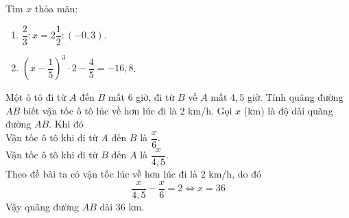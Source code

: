 	\begin{ex}%
		Tìm $x$ thỏa mãn:
		\begin{enumerate}
			\item $\dfrac{2}{3}:x=2\dfrac{1}{2}:(-0,3)$.
			\item $\left(x-\dfrac{1}{5} \right)^3\cdot 2-\dfrac{4}{5}=-16,8 $.
			
		\end{enumerate}
	\end{ex}
	
	\begin{ex}%
		Một ô tô đi từ $ A $ đến $ B $ mất $ 6 $ giờ, đi từ $ B $ về $ A $ mất $ 4,5 $ giờ. Tính quãng đường $ AB $ biết vận tốc ô tô lúc về hơn lúc đi là $ 2 $ km/h.
		\loigiai
		{
			Gọi $ x $ (km) là độ dài quãng đường $ AB $. Khi đó\\
			Vận tốc ô tô khi đi từ $ A $ đến $ B $ là $ \dfrac{x}{6} $.\\ 
			Vận tốc ô tô khi đi từ $ B $ đến $ A $ là $ \dfrac{x}{4,5} $.\\ 
			Theo đề bài ta có vận tốc lúc về hơn lúc đi là $ 2$  km/h, do đó 
			\[ \dfrac{x}{4,5} - \dfrac{x}{6} = 2 \Leftrightarrow x=36\]
			Vậy quãng đường $ AB $ dài $ 36 $ km.
		}
	\end{ex}
	
